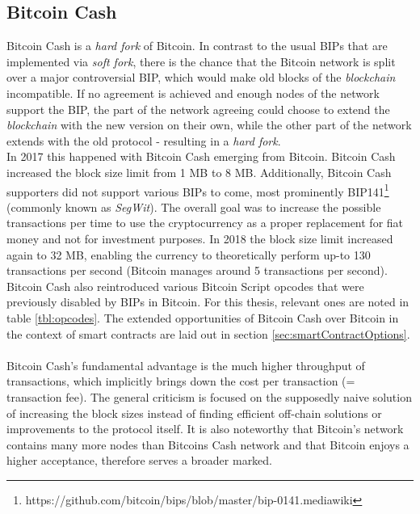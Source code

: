 \documentclass{cacthesis}
\newcounter{protocol}
\begin{document}
        \subsection{Bitcoin Cash}
        Bitcoin Cash is a \textit{hard fork} of Bitcoin. In contrast to the usual BIPs that are implemented via \textit{soft fork}, there is the chance that the Bitcoin network is split over a major controversial BIP, which would make old blocks of the \textit{blockchain} incompatible. If no agreement is achieved and enough nodes of the network support the BIP, the part of the network agreeing could choose to extend the \textit{blockchain} with the new version on their own, while the other part of the network extends with the old protocol - resulting in a \textit{hard fork}. \\
        In 2017 this happened with Bitcoin Cash emerging from Bitcoin. Bitcoin Cash increased the block size limit from 1 MB to 8 MB. Additionally, Bitcoin Cash supporters did not support various BIPs to come, most prominently BIP141\footnote{https://github.com/bitcoin/bips/blob/master/bip-0141.mediawiki} (commonly known as \textit{SegWit}). The overall goal was to increase the possible transactions per time to use the cryptocurrency as a proper replacement for fiat money and not for investment purposes. In 2018 the block size limit increased again to 32 MB, enabling the currency to theoretically perform up-to 130 transactions per second (Bitcoin manages around 5 transactions per second). Bitcoin Cash also reintroduced various Bitcoin Script opcodes that were previously disabled by BIPs in Bitcoin. For this thesis, relevant ones are noted in table \ref{tbl:opcodes}. The extended opportunities of Bitcoin Cash over Bitcoin in the context of smart contracts are laid out in section \ref{sec:smartContractOptions}. \\\\
        Bitcoin Cash's fundamental advantage is the much higher throughput of transactions, which implicitly brings down the cost per transaction (= transaction fee). The general criticism is focused on the supposedly naive solution of increasing the block sizes instead of finding efficient off-chain solutions or improvements to the protocol itself. It is also noteworthy that Bitcoin's network contains many more nodes than Bitcoins Cash network and that Bitcoin enjoys a higher acceptance, therefore serves a broader marked.
        
\end{document}
